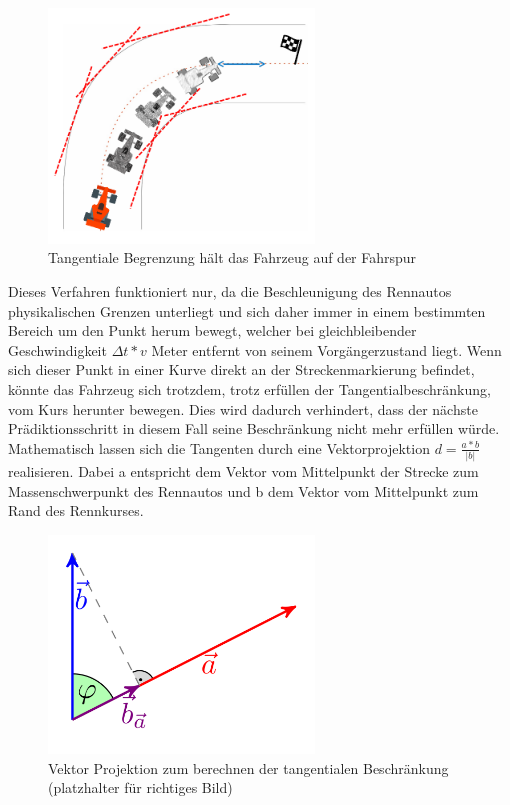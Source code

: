 \documentclass{like}
\begin{document}
\begin{figure}[ht!]
	\centering
	\includegraphics[width=200pt]{Abbildungen/tangentialConstraint.png}
	\caption{Tangentiale Begrenzung hält das Fahrzeug auf der Fahrspur}
	\label{fig:costGoalDist}
\end{figure}
Dieses Verfahren funktioniert nur, da die Beschleunigung des Rennautos physikalischen Grenzen unterliegt und sich daher immer in einem bestimmten Bereich um den Punkt herum bewegt, welcher bei gleichbleibender Geschwindigkeit $\Delta t * v$ Meter entfernt von seinem Vorgängerzustand liegt. Wenn sich dieser Punkt in einer Kurve direkt an der Streckenmarkierung befindet, könnte das Fahrzeug sich trotzdem, trotz erfüllen der Tangentialbeschränkung, vom Kurs herunter bewegen. Dies wird dadurch verhindert, dass der nächste Prädiktionsschritt in diesem Fall seine Beschränkung nicht mehr erfüllen würde.
Mathematisch lassen sich die Tangenten durch eine Vektorprojektion $d = \frac{a*b}{|b|}$ realisieren. Dabei a entspricht dem Vektor vom Mittelpunkt der Strecke zum Massenschwerpunkt des Rennautos und b dem Vektor vom Mittelpunkt zum Rand des Rennkurses. 

\begin{figure}[ht!]
	\centering
	\includegraphics[width=200pt]{Abbildungen/vektorProjektion.png}
	\caption{Vektor Projektion zum berechnen der tangentialen Beschränkung (platzhalter für richtiges Bild)}
	\label{fig:vektorProjektion}
\end{figure}
\end{document}
